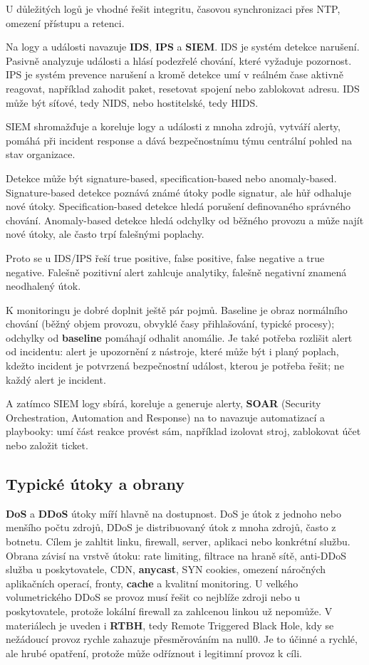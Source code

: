 U důležitých logů je vhodné řešit integritu, časovou synchronizaci přes NTP, omezení přístupu a retenci.

Na logy a události navazuje \textbf{IDS}, \textbf{IPS} a \textbf{SIEM}. IDS je systém detekce narušení. Pasivně analyzuje události a hlásí podezřelé chování, které vyžaduje pozornost. IPS je systém prevence narušení a kromě detekce umí v reálném čase aktivně reagovat, například zahodit paket, resetovat spojení nebo zablokovat adresu. IDS může být síťové, tedy NIDS, nebo hostitelské, tedy HIDS.

SIEM shromažďuje a koreluje logy a události z mnoha zdrojů, vytváří alerty, pomáhá při incident response a dává bezpečnostnímu týmu centrální pohled na stav organizace.

Detekce může být signature-based, specification-based nebo anomaly-based. Signature-based detekce poznává známé útoky podle signatur, ale hůř odhaluje nové útoky. Specification-based detekce hledá porušení definovaného správného chování. Anomaly-based detekce hledá odchylky od běžného provozu a může najít nové útoky, ale často trpí falešnými poplachy.

Proto se u IDS/IPS řeší true positive, false positive, false negative a true negative. Falešně pozitivní alert zahlcuje analytiky, falešně negativní znamená neodhalený útok.

K monitoringu je dobré doplnit ještě pár pojmů. Baseline je obraz normálního chování (běžný objem provozu, obvyklé časy přihlašování, typické procesy); odchylky od \textbf{baseline} pomáhají odhalit anomálie. Je také potřeba rozlišit alert od incidentu: alert je upozornění z nástroje, které může být i planý poplach, kdežto incident je potvrzená bezpečnostní událost, kterou je potřeba řešit; ne každý alert je incident.

A zatímco SIEM logy sbírá, koreluje a generuje alerty, \textbf{SOAR} (Security Orchestration, Automation and Response) na to navazuje automatizací a playbooky: umí část reakce provést sám, například izolovat stroj, zablokovat účet nebo založit ticket.

\subsection*{Typické útoky a obrany}

\textbf{DoS} a \textbf{DDoS} útoky míří hlavně na dostupnost. DoS je útok z jednoho nebo menšího počtu zdrojů, DDoS je distribuovaný útok z mnoha zdrojů, často z botnetu. Cílem je zahltit linku, firewall, server, aplikaci nebo konkrétní službu. Obrana závisí na vrstvě útoku: rate limiting, filtrace na hraně sítě, anti-DDoS služba u poskytovatele, CDN, \textbf{anycast}, SYN cookies, omezení náročných aplikačních operací, fronty, \textbf{cache} a kvalitní monitoring. U velkého volumetrického DDoS se provoz musí řešit co nejblíže zdroji nebo u poskytovatele, protože lokální firewall za zahlcenou linkou už nepomůže. V materiálech je uveden i \textbf{RTBH}, tedy Remote Triggered Black Hole, kdy se nežádoucí provoz rychle zahazuje přesměrováním na null0. Je to účinné a rychlé, ale hrubé opatření, protože může odříznout i legitimní provoz k cíli.

